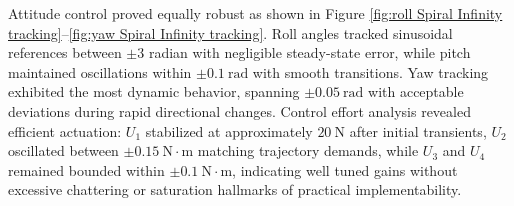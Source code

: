 Attitude control proved equally robust as shown in Figure \ref{fig:roll Spiral Infinity tracking}--\ref{fig:yaw Spiral Infinity tracking}. Roll angles tracked sinusoidal references between $\pm 3$ radian with negligible steady-state error, while pitch maintained oscillations within $\pm 0.1~\text{rad}$ with smooth transitions. Yaw tracking exhibited the most dynamic behavior, spanning $\pm 0.05~\text{rad}$ with acceptable deviations during rapid directional changes. Control effort analysis revealed efficient actuation: $U_{1}$ stabilized at approximately $20~\text{N}$ after initial transients, $U_{2}$ oscillated between $\pm 0.15~\text{N}\cdot\text{m}$ matching trajectory demands, while $U_{3}$ and $U_{4}$ remained bounded within $\pm 0.1~\text{N}\cdot\text{m}$, indicating well tuned gains without excessive chattering or saturation hallmarks of practical implementability.


